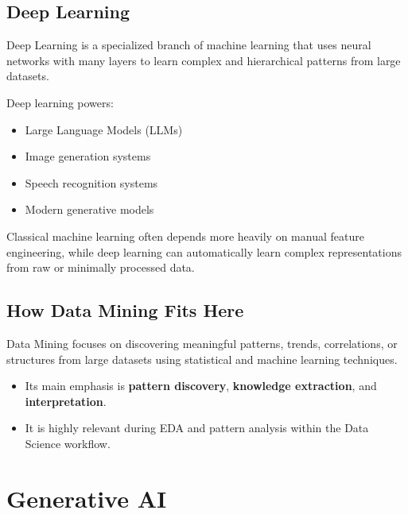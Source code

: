\documentclass[11pt,a4paper]{article}
\begin{document}
\subsection{Deep Learning}

\begin{definitionbox}
Deep Learning is a specialized branch of machine learning that uses neural networks with many layers to learn complex and hierarchical patterns from large datasets.
\end{definitionbox}

Deep learning powers:
\begin{itemize}[leftmargin=*]
  \item Large Language Models (LLMs)
  \item Image generation systems
  \item Speech recognition systems
  \item Modern generative models
\end{itemize}

\begin{conceptbox}
Classical machine learning often depends more heavily on manual feature engineering, while deep learning can automatically learn complex representations from raw or minimally processed data.
\end{conceptbox}

\subsection{How Data Mining Fits Here}

\begin{definitionbox}
Data Mining focuses on discovering meaningful patterns, trends, correlations, or structures from large datasets using statistical and machine learning techniques.
\end{definitionbox}

\begin{itemize}[leftmargin=*]
  \item Its main emphasis is \textbf{pattern discovery}, \textbf{knowledge extraction}, and \textbf{interpretation}.
  \item It is highly relevant during EDA and pattern analysis within the Data Science workflow.
\end{itemize}

\section{Generative AI}
\end{document}
